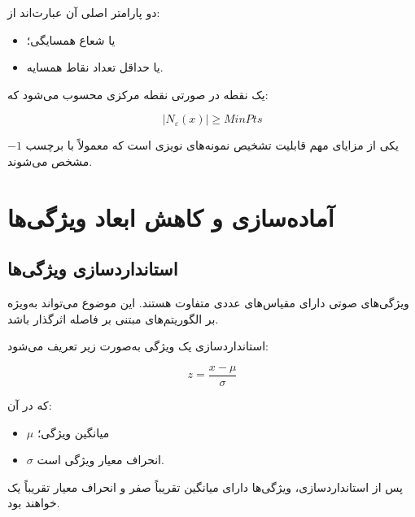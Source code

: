 \documentclass[12pt,a4paper,oneside]{report}
\begin{document}
دو پارامتر اصلی آن عبارت‌اند از:

\begin{itemize}
	\item {} یا شعاع همسایگی؛
	\item {} یا حداقل تعداد نقاط همسایه.
\end{itemize}

یک نقطه در صورتی نقطه مرکزی محسوب می‌شود که:

\begin{equation}
|N_{\varepsilon}(x)|
\geq
MinPts
\end{equation}

یکی از مزایای مهم
قابلیت تشخیص نمونه‌های نویزی است که معمولاً با برچسب $-1$ مشخص می‌شوند.

\section{آماده‌سازی و کاهش ابعاد ویژگی‌ها}


\subsection{استانداردسازی ویژگی‌ها}

ویژگی‌های صوتی دارای مقیاس‌های عددی متفاوت هستند. این موضوع می‌تواند به‌ویژه بر الگوریتم‌های مبتنی بر فاصله اثرگذار باشد.

استانداردسازی یک ویژگی به‌صورت زیر تعریف می‌شود:

\begin{equation}
z
=
\frac{x-\mu}{\sigma}
\end{equation}

که در آن:

\begin{itemize}
	\item $\mu$ میانگین ویژگی؛
	\item $\sigma$ انحراف معیار ویژگی است.
\end{itemize}

پس از استانداردسازی، ویژگی‌ها دارای میانگین تقریباً صفر و انحراف معیار تقریباً یک خواهند بود.


\subsection{}
\end{document}

